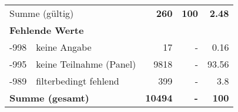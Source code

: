 \begin{longtable}{lXrrr}
     \midrule
     \multicolumn{2}{l}{Summe (gültig)} &
       \textbf{\num{260}} &
     \textbf{100} &
       \textbf{\num[round-mode=places,round-precision=2]{2,48}} \\
     \multicolumn{5}{l}{\textbf{Fehlende Werte}}\\
       -998 &
       keine Angabe &
         \num{17} &
        - &
         \num[round-mode=places,round-precision=2]{0,16} \\
       -995 &
       keine Teilnahme (Panel) &
         \num{9818} &
        - &
         \num[round-mode=places,round-precision=2]{93,56} \\
       -989 &
       filterbedingt fehlend &
         \num{399} &
        - &
         \num[round-mode=places,round-precision=2]{3,8} \\
     \midrule
     \multicolumn{2}{l}{\textbf{Summe (gesamt)}} &
          \textbf{\num{10494}} &
        \textbf{-} &
        \textbf{100} \\
     \bottomrule
     \end{longtable}
     
